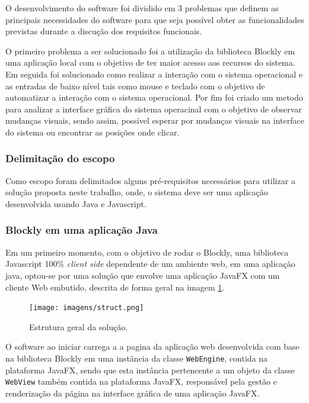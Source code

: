 \documentclass[tg]{mdtufsm}
\begin{document}
    O desenvolvimento do software foi dividido em 3 problemas que definem as principais necessidades do software para que seja possível obter as funcionalidades previstas durante a discução dos requisitos funcionais.

    O primeiro problema a ser solucionado foi a utilização da biblioteca Blockly em uma aplicação local com o objetivo de ter maior acesso aos recursos do sistema.
    Em seguida foi solucionado como realizar a interação com o sistema operacional e as entradas de baixo nível tais como mouse e teclado com o objetivo de automatizar a interação com o sistema operacional. Por fim foi criado um metodo para analizar a interface gráfica do sistema operacinal com o objetivo de observar mudanças visuais, sendo assim, possível esperar por mudanças visuais na interface do sistema ou encontrar as posições onde clicar.

    \subsubsection {Delimitação do escopo}

    Como escopo foram delimitados alguns pré-requisitos necessários para utilizar a solução proposta neste trabalho, onde, o sistema deve ser uma aplicação desenvolvida usando Java e Javascript.

    \subsubsection {Blockly em uma aplicação Java}

    Em um primeiro momento, com o objetivo de rodar o Blockly, uma biblioteca Javascript 100\% \emph{client side} dependente de um ambiente web, em uma aplicação java, optou-se por uma solução que envolve uma aplicação JavaFX com um cliente Web embutido, descrita de forma geral na imagem \ref{fig:struct}.

    \begin{figure}[!htb]
        {\centering
        \texttt{[image: imagens/struct.png]}
        \caption{Estrutura geral da solução.}
        \label{fig:struct}}
    \end{figure}

    O software ao iniciar carrega a a pagina da aplicação web desenvolvida com base na biblioteca Blockly em uma instância da classe \texttt{WebEngine}, contida na plataforma JavaFX, sendo que esta instância pertencente a um objeto da classe \texttt{WebView} também contida na plataforma JavaFX, responsável pela gestão e renderização da página na interface gráfica de uma aplicação JavaFX.
\end{document}
